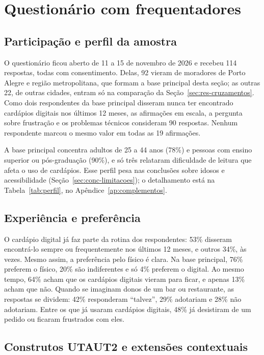 \section{Questionário com frequentadores}
\label{sec:res-questionario}

\subsection{Participação e perfil da amostra}
\label{sec:res-perfil}

O questionário ficou aberto de 11 a 15 de novembro de 2026 e recebeu 114 respostas, todas com consentimento. Delas, 92 vieram de moradores de Porto Alegre e região metropolitana, que formam a base principal desta seção; as outras 22, de outras cidades, entram só na comparação da Seção~\ref{sec:res-cruzamentos}. Como dois respondentes da base principal disseram nunca ter encontrado cardápios digitais nos últimos 12 meses, as afirmações em escala, a pergunta sobre frustração e os problemas técnicos consideram 90 respostas. Nenhum respondente marcou o mesmo valor em todas as 19 afirmações.

A base principal concentra adultos de 25 a 44 anos (78\%) e pessoas com ensino superior ou pós-graduação (90\%), e só três relataram dificuldade de leitura que afeta o uso de cardápios. Esse perfil pesa nas conclusões sobre idosos e acessibilidade (Seção~\ref{sec:conc-limitacoes}); o detalhamento está na Tabela~\ref{tab:perfil}, no Apêndice~\ref{ap:complementos}.

\subsection{Experiência e preferência}
\label{sec:res-experiencia}

O cardápio digital já faz parte da rotina dos respondentes: 53\% disseram encontrá-lo sempre ou frequentemente nos últimos 12 meses, e outros 34\%, às vezes. Mesmo assim, a preferência pelo físico é clara. Na base principal, 76\% preferem o físico, 20\% são indiferentes e só 4\% preferem o digital. Ao mesmo tempo, 64\% acham que os cardápios digitais vieram para ficar, e apenas 13\% acham que não. Quando se imaginam donos de um bar ou restaurante, as respostas se dividem: 42\% responderam ``talvez'', 29\% adotariam e 28\% não adotariam. Entre os que já usaram cardápios digitais, 48\% já desistiram de um pedido ou ficaram frustrados com eles.

\subsection{Construtos UTAUT2 e extensões contextuais}
\label{sec:res-construtos}

